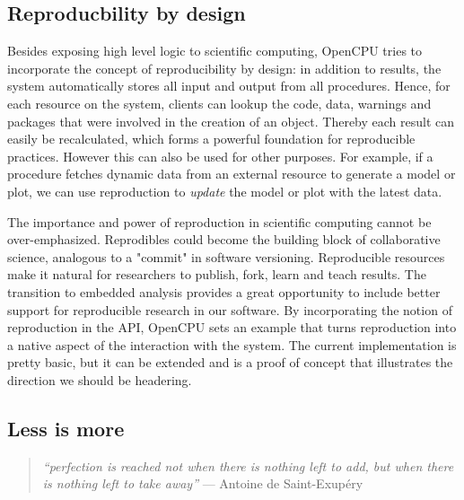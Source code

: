 \subsection{Reproducbility by design}

Besides exposing high level logic to scientific computing, OpenCPU tries to incorporate the concept of reproducibility by design: in addition to results, the system automatically stores all input and output from all procedures. Hence, for each resource on the system, clients can lookup the code, data, warnings and packages that were involved in the creation of an object. Thereby each result can easily be recalculated, which forms a powerful foundation for reproducible practices. However this can also be used for other purposes. For example, if a procedure fetches dynamic data from an external resource to generate a model or plot, we can use reproduction to \emph{update} the model or plot with the latest data.

The importance and power of reproduction in scientific computing cannot be over-emphasized. Reprodibles could become the building block of collaborative science, analogous to a "commit" in software versioning. Reproducible resources make it natural for researchers to publish, fork, learn and teach results. The transition to embedded analysis provides a great opportunity to include better support for reproducible research in our software. By incorporating the notion of reproduction in the API, OpenCPU sets an example that turns reproduction into a native aspect of the interaction with the system. The current implementation is pretty basic, but it can be extended and is a proof of concept that illustrates the direction we should be headering.  

\subsection{Less is more}

\begin{quote}
\emph{``perfection is reached not when there is nothing left to add, but when there is nothing left to take away''} --- Antoine de Saint-Exupéry
\end{quote}

\vspace{8pt}


